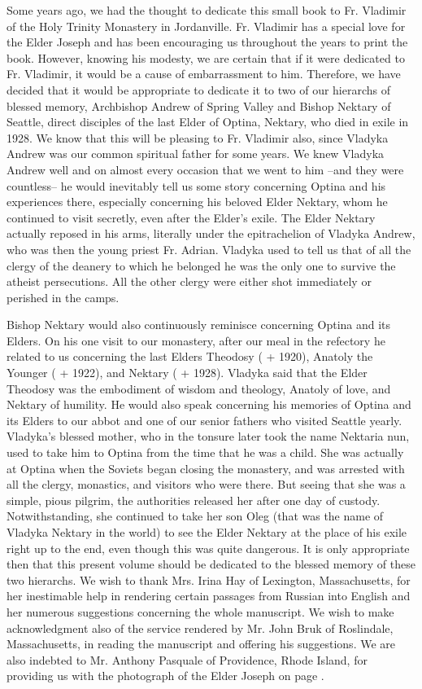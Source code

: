 Some years ago, we had the thought to dedicate this small book to Fr. Vladimir of the Holy Trinity Monastery in Jordanville. Fr. Vladimir has a special love for the Elder Joseph and has been encouraging us throughout the years to print the book. However, knowing his modesty, we are certain that if it were dedicated to Fr. Vladimir, it would be a cause of embarrassment to him. Therefore, we have decided that it would be appropriate to dedicate it to two of our hierarchs of blessed memory, Archbishop Andrew of Spring Valley and Bishop Nektary of Seattle, direct disciples of the last Elder of Optina, Nektary, who died in exile in 1928. We know that this will be pleasing to Fr. Vladimir also, since Vladyka Andrew was our common spiritual father for some years. We knew Vladyka Andrew well and on almost every occasion that we went to him --and they were countless-- he would inevitably tell us some story concerning Optina and his experiences there, especially concerning his beloved Elder Nektary, whom he continued to visit secretly, even after the Elder's exile. The Elder Nektary actually reposed in his arms, literally under the epitrachelion of Vladyka Andrew, who was then the young priest Fr. Adrian. Vladyka used to tell us that of all the clergy of the deanery to which he belonged he was the only one to survive the atheist persecutions. All the other clergy were either shot immediately or perished in the camps.

Bishop Nektary would also continuously reminisce concerning Optina and its Elders. On his one visit to our monastery, after our meal in the refectory he related to us concerning the last Elders Theodosy ( + 1920), Anatoly the Younger ( + 1922), and Nektary ( + 1928). Vladyka said that the Elder Theodosy was the embodiment of wisdom and theology, Anatoly of love, and Nektary of humility. He would also speak concerning his memories of Optina and its Elders to our abbot and one of our senior fathers who visited Seattle yearly. Vladyka's blessed mother, who in the tonsure later took the name Nektaria nun, used to take him to Optina from the time that he was a child. She was actually at Optina when the Soviets began closing the monastery, and was arrested with all the clergy, monastics, and visitors who were there. But seeing that she was a simple, pious pilgrim, the authorities released her after one day of custody. Notwithstanding, she continued to take her son Oleg (that was the name of Vladyka Nektary in the world) to see the Elder Nektary at the place of his exile right up to the end, even though this was quite dangerous. It is only appropriate then that this present volume should be dedicated to the blessed memory of these two hierarchs. We wish to thank Mrs. Irina Hay of Lexington, Massachusetts, for her inestimable help in rendering certain passages from Russian into English and her numerous suggestions concerning the whole manuscript. We wish to make acknowledgment also of the service rendered by Mr. John Bruk of Roslindale, Massachusetts, in reading the manuscript and offering his suggestions. We are also indebted to Mr. Anthony Pasquale of Providence, Rhode Island, for providing us with the photograph of the Elder Joseph on page \pageref{elder-joseph-bed}.


